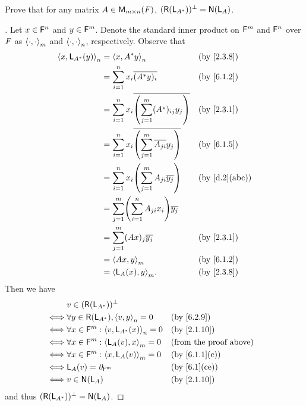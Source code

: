 \begin{ex}\label{ex:6.2.12}
	Prove that for any matrix \(A \in \MS\), \((\rg{\L_{A^*}})^{\perp} = \ns{\L_A}\).
\end{ex}

\begin{proof}[]
	Let \(x \in \mathsf{F}^n\) and \(y \in \mathsf{F}^m\).
	Denote the standard inner product on \(\mathsf{F}^m\) and \(\mathsf{F}^n\) over \(\mathit{F}\) as \(\left\langle\cdot, \cdot\right\rangle_m\) and \(\left\langle\cdot, \cdot\right\rangle_n\), respectively.
	Observe that
	\begin{align*}
		\inn{x, \L_{A^*}(y)}_n & = \inn{x, A^* y}_n                                                 &  & \by{2.3.8}    \\
		                       & = \sum_{i = 1}^n x_i \conj{(A^* y)_i}                              &  & \by{6.1.2}    \\
		                       & = \sum_{i = 1}^n x_i \conj{\pa{\sum_{j = 1}^m (A^*)_{i j} y_j}}    &  & \by{2.3.1}    \\
		                       & = \sum_{i = 1}^n x_i \conj{\pa{\sum_{j = 1}^m \conj{A_{j i}} y_j}} &  & \by{6.1.5}    \\
		                       & = \sum_{i = 1}^n x_i \pa{\sum_{j = 1}^m A_{j i} \conj{y_j}}        &  & \by{d.2}[abc] \\
		                       & = \sum_{j = 1}^m \pa{\sum_{i = 1}^n A_{j i} x_i} \conj{y_j}                           \\
		                       & = \sum_{j = 1}^m (Ax)_j \conj{y_j}                                 &  & \by{2.3.1}    \\
		                       & = \inn{Ax, y}_m                                                    &  & \by{6.1.2}    \\
		                       & = \inn{\L_A(x), y}_m.                                              &  & \by{2.3.8}
	\end{align*}
	Then we have
	\begin{align*}
		     & v \in (\rg{\L_{A^*}})^{\perp}                                                          \\
		\iff & \forall y \in \rg{\L_{A^*}}, \inn{v, y}_n = 0       &  & \by{6.2.9}                    \\
		\iff & \forall x \in \vs{F}^m : \inn{v, \L_{A^*}(x)}_n = 0 &  & \by{2.1.10}                   \\
		\iff & \forall x \in \vs{F}^m : \inn{\L_A(v), x}_m = 0     &  & \text{(from the proof above)} \\
		\iff & \forall x \in \vs{F}^m : \inn{x, \L_A(v)}_m = 0     &  & \by{6.1.1}[c]                 \\
		\iff & \L_A(v) = \zv_{\vs{F}^m}                            &  & \by{6.1}[ce]                  \\
		\iff & v \in \ns{\L_A}                                     &  & \by{2.1.10}
	\end{align*}
	and thus \((\rg{\L_{A^*}})^{\perp} = \ns{\L_A}\).
\end{proof}

